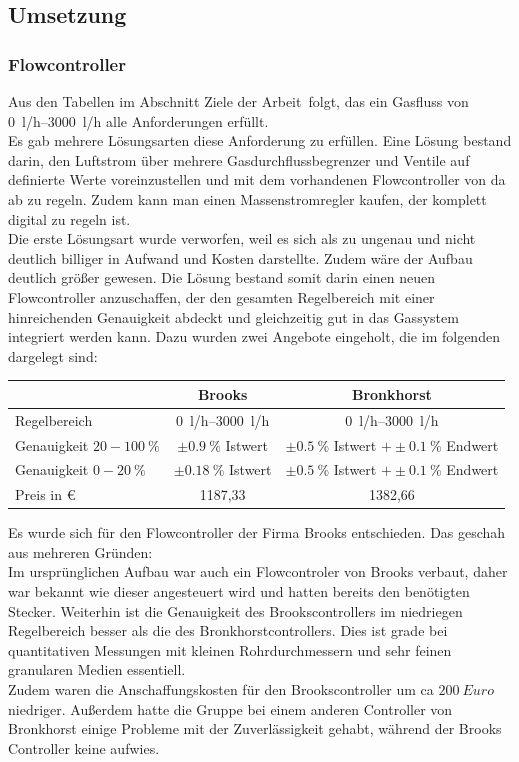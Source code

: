 \subsection{Umsetzung}

\subsubsection{Flowcontroller}

Aus den Tabellen im Abschnitt \glqq Ziele der Arbeit\grqq \ folgt, das ein Gasfluss von \SIrange{0}{3000}{l/h} alle Anforderungen erfüllt. \\
Es gab mehrere Lösungsarten diese Anforderung zu erfüllen. Eine Lösung bestand darin, den Luftstrom über mehrere Gasdurchflussbegrenzer und Ventile auf definierte Werte voreinzustellen und mit dem vorhandenen Flowcontroller von da ab zu regeln. Zudem kann man einen Massenstromregler kaufen, der komplett digital zu regeln ist. \\
Die erste Lösungsart wurde verworfen, weil es sich als zu ungenau und nicht deutlich billiger in Aufwand und Kosten darstellte. Zudem wäre der Aufbau deutlich größer gewesen. Die Lösung bestand somit darin einen neuen Flowcontroller anzuschaffen, der den gesamten Regelbereich mit einer hinreichenden Genauigkeit abdeckt und gleichzeitig gut in das Gassystem integriert werden kann. Dazu wurden zwei Angebote eingeholt, die im folgenden dargelegt sind:


\begin{tabular}{l|c|c}
	 & Brooks & Bronkhorst \\ 
	\hline Regelbereich & \SIrange{0}{3000}{l/h} & \SIrange{0}{3000}{l/h} \\ 
	\hline Genauigkeit $20 - \SI{100}{\%}$ & $\pm \SI{0,9}{\%}$ Istwert & $\pm \SI{0,5}{\%}$ Istwert $+ \pm \SI{0,1}{\%}$ Endwert\\ 
	\hline Genauigkeit $0 - \SI{20}{\%}$ & $\pm \SI{0,18}{\%}$ Istwert & $\pm \SI{0,5}{\%}$ Istwert $+ \pm \SI{0,1}{\%}$ Endwert \\ 
	\hline Preis in \euro & 1187,33 & 1382,66 \\ 
\end{tabular} 

\vspace{0,5cm}

Es wurde sich für den Flowcontroller der Firma Brooks entschieden. Das geschah aus mehreren Gründen: \\
Im ursprünglichen Aufbau war auch ein Flowcontroler von Brooks verbaut, daher war bekannt wie dieser angesteuert wird und hatten bereits den benötigten Stecker. Weiterhin ist die Genauigkeit des Brookscontrollers im niedriegen Regelbereich besser als die des Bronkhorstcontrollers. Dies ist grade bei quantitativen Messungen mit kleinen Rohrdurchmessern und sehr feinen granularen Medien essentiell. \\
Zudem waren die Anschaffungskosten für den Brookscontroller um ca $\SI{200}{Euro}$ niedriger. Außerdem hatte die Gruppe bei einem anderen Controller von Bronkhorst einige Probleme mit der Zuverlässigkeit gehabt, während der Brooks Controller keine aufwies.


